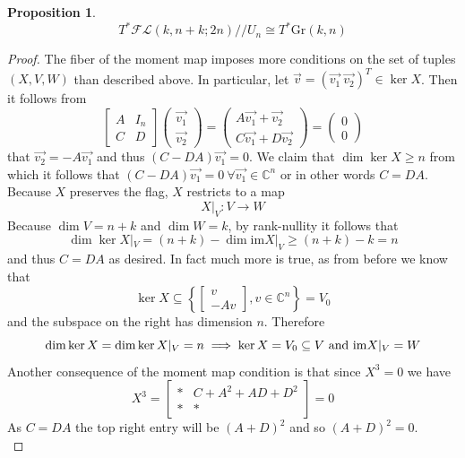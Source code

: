 \documentclass[12pt]{amsart}
\numberwithin{equation}{section}
\newtheorem{Proposition}[equation]{Proposition}
\theoremstyle{definition}
\numberwithin{figure}{section}
\newcommand{\C}{\mathbb{C}}
\newcommand{\grass}[2]{\mathrm{Gr}(#1,#2)}
\newcommand{\fl}{\mathcal{FL}}
\newcommand{\set}[1]{\left\{ #1 \right\}}
\begin{document}
\begin{Proposition}
\[  T^*\fl(k,  n+k; 2n)//U_n\cong T^*\grass{k}{n} \]
\end{Proposition}
\begin{proof}
The fiber of the moment map imposes more conditions on the set of tuples $(X, V, W)$ than described above. In particular, let $\vec{v}=(\vec{v_1} \ \vec{v_2})^T\in \ker X$. Then it follows from
\[ \begin{bmatrix}
A & I_n \\
C & D
\end{bmatrix}\begin{pmatrix}
\vec{v_1}\\
\vec{v_2}
\end{pmatrix}=\begin{pmatrix}
A\vec{v_1}+\vec{v_2}\\
C\vec{v_1}+D\vec{v_2}
\end{pmatrix} =\begin{pmatrix}
0 \\
0
\end{pmatrix}
\]
that $\vec{v_2}=-A\vec{v_1}$ and thus $(C-DA)\vec{v_1}=0$. We claim that $\dim \ker X\ge n$ from which it follows that $(C-DA)\vec{v_1}=0 \ \forall \vec{v_1}\in \C^n$ or in other words $C=DA$. Because $X$ preserves the flag, $X$ restricts to a map
\[  X|_V: V\to W \]
Because $\dim V=n+k$ and $\dim W=k$, by rank-nullity it follows that
\[ \dim \ker X|_V=(n+k)-\dim \mathrm{im } X|_V\ge (n+k)-k=n \]
and thus $C=DA$ as desired. In fact much more is true, as from before we know that
\[  \ker X \subseteq \set{\begin{bmatrix}
v \\
-Av
\end{bmatrix}, v\in \C^n}=V_0\]
and the subspace on the right has dimension $n$. Therefore 
$$\dim \ker X=\dim \ker X|_V=n\implies\ker X =V_0\subseteq V \textnormal{ and } \mathrm{im }X|_V=W $$
Another consequence of the moment map condition is that since $X^3=0$ we have
\[ X^3=\begin{bmatrix}
* & C+A^2+AD+D^2 \\
* & *
\end{bmatrix} = 0\]
As $C=DA$ the top right entry will be $(A+D)^2$ and so $(A+D)^2=0$. \\


\end{proof}
\end{document}
